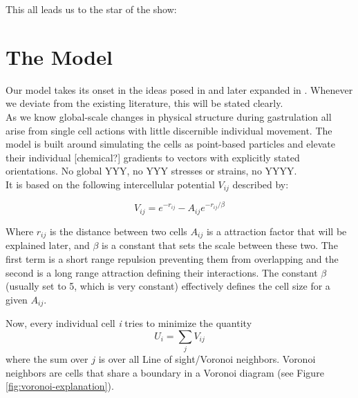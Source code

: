 






This all leads us to the star of the show:

\section{The Model}

Our model takes its onset in the ideas posed in  and later expanded in . Whenever we deviate from the existing literature, this will be stated clearly.\\

As we know global-scale changes in physical structure during gastrulation all arise from single cell actions with little discernible individual movement. The model is built around simulating the cells as point-based particles and elevate their individual [chemical?] gradients to vectors with explicitly stated orientations. No global YYY, no YYY stresses or strains, no YYYY. \\
It is based on the following intercellular potential $V_{ij}$ described by: 

\begin{equation}
    V_{ij}=e^{-r_{ij}}-A_{ij} e^{-r_{ij}/\beta}
    \label{eq:main-pot}
\end{equation}

Where $r_{ij}$ is the distance between two cells $A_{ij}$ is a attraction factor that will be explained later, and $\beta$ is a constant that sets the scale between these two. The first term is a short range repulsion preventing them from overlapping and the second is a long range attraction defining their interactions. The constant $\beta$ (usually set to 5, which is very constant) effectively defines the cell size for a given $A_{ij}$. 

Now, every individual cell \textit{i} tries to minimize the quantity 
\begin{equation}
    U_i = \sum_j V_{ij}
    \label{eq:totalPot}
\end{equation}
where the sum over $j$ is over all Line of sight/Voronoi neighbors. Voronoi neighbors are cells that share a boundary in a Voronoi diagram (see Figure \ref{fig:voronoi-explanation}). 

